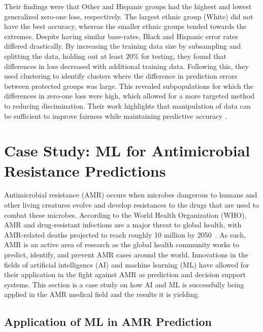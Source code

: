 \documentclass[a4paper]{article}
\begin{document}
Their findings were that Other and Hispanic groups had the highest and lowest generalized zero-one loss, respectively. The largest ethnic group (White) did not have the best accuracy, whereas the smaller ethnic groups tended towards the extremes. Despite having similar base-rates, Black and Hispanic error rates differed drastically. By increasing the training data size by subsampling and splitting the data, holding out at least 20\% for testing, they found that differences in loss decreased with additional training data. Following this, they used clustering to identify clusters where the difference in prediction errors between protected groups was large. This revealed subpopulations for which the differences in zero-one loss were high, which allowed for a more targeted method to reducing discimination. Their work highlights that manipulation of data can be sufficient to improve fairness while maintaining predictive accuracy \cite{Chen_2018}.

\section{Case Study: ML for Antimicrobial Resistance Predictions}

Antimicrobial resistance (AMR) occurs when microbes dangerous to humans and other living creatures evolve and develop resistances to the drugs that are used to combat these microbes. According to the World Health Organization (WHO), AMR and drug-resistant infections are a major threat to global health, with AMR-related deaths projected to reach roughly 10 million by 2050~\cite{balkhy_amr_2021}. As such, AMR is an active area of research as the global health community works to predict, identify, and prevent AMR cases around the world. Innovations in the fields of artificial intelligence (AI) and machine learning (ML) have allowed for their application in the fight against AMR as prediction and decision support systems. This section is a case study on how AI and ML is successfully being applied in the AMR medical field and the results it is yielding.

\subsection{Application of ML in AMR Prediction}
\end{document}
